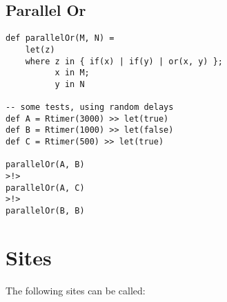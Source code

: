 \documentclass{article}
\begin{document}
\subsection{Parallel Or}
\begin{verbatim}
def parallelOr(M, N) =
	let(z)
	where z in { if(x) | if(y) | or(x, y) };
		  x in M;
		  y in N

-- some tests, using random delays
def A = Rtimer(3000) >> let(true)
def B = Rtimer(1000) >> let(false)
def C = Rtimer(500) >> let(true)

parallelOr(A, B) 
>!> 
parallelOr(A, C)
>!> 
parallelOr(B, B)
\end{verbatim}


\section{Sites}

The following sites can be called:
\end{document}
